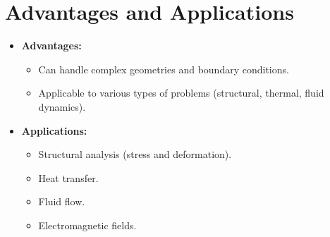 \section{Advantages and Applications}
\begin{itemize}
    \item \textbf{Advantages:}
    \begin{itemize}
        \item Can handle complex geometries and boundary conditions.
        \item Applicable to various types of problems (structural, thermal, fluid dynamics).
    \end{itemize}
    \item \textbf{Applications:}
    \begin{itemize}
        \item Structural analysis (stress and deformation).
        \item Heat transfer.
        \item Fluid flow.
        \item Electromagnetic fields.
    \end{itemize}
\end{itemize}

